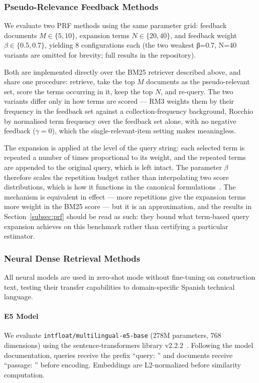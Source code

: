 \documentclass[preprint,12pt]{elsarticle}
\begin{document}
\subsubsection{Pseudo-Relevance Feedback Methods}

We evaluate two PRF methods using the same parameter grid: feedback documents $M \in \{5, 10\}$, expansion terms $N \in \{20, 40\}$, and feedback weight $\beta \in \{0.5, 0.7\}$, yielding 8 configurations each (the two weakest β=0.7, N=40 variants are
omitted for brevity; full results in the repository).

Both are implemented directly over the BM25 retriever described above, and share one procedure: retrieve, take the top $M$ documents as the pseudo-relevant set, score the terms occurring in it, keep the top $N$, and re-query. The two variants differ only in how terms are scored --- RM3 weights them by their frequency in the feedback set against a collection-frequency background, Rocchio by normalised term frequency over the feedback set alone, with no negative feedback ($\gamma = 0$), which the single-relevant-item setting makes meaningless.

The expansion is applied at the level of the query string: each selected term is repeated a number of times proportional to its weight, and the repeated terms are appended to the original query, which is left intact. The parameter $\beta$ therefore scales the repetition budget rather than interpolating two score distributions, which is how it functions in the canonical formulations~\citep{abdul2004umass, rocchio1971relevance}. The mechanism is equivalent in effect --- more repetitions give the expansion terms more weight in the BM25 score --- but it is an approximation, and the results in Section~\ref{subsec:prf} should be read as such: they bound what term-based query expansion achieves on this benchmark rather than certifying a particular estimator.

\subsubsection{Neural Dense Retrieval Methods}
\label{subsec:neural_methods}

All neural models are used in zero-shot mode without fine-tuning on construction text, testing their transfer capabilities to domain-specific Spanish technical language.

\paragraph{E5 Model}
We evaluate \texttt{intfloat/multilingual-e5-base} (278M parameters, 768 dimensions) using the sentence-transformers library v2.2.2~\citep{reimers2019sentence}. Following the model documentation, queries receive the prefix ``query: '' and documents receive ``passage: '' before encoding. Embeddings are L2-normalized before similarity computation.
\end{document}
